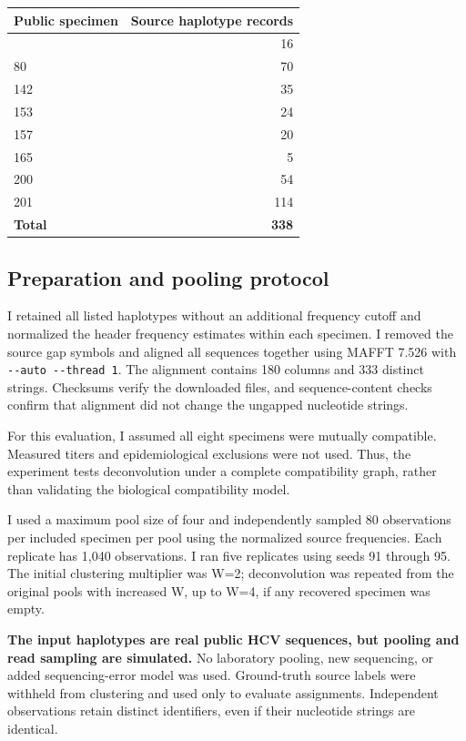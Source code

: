 \begin{longtable}[]{@{}lr@{}}
\toprule\noalign{}
Public specimen & Source haplotype records \\
\midrule\noalign{}
\endhead
\bottomrule\noalign{}
\endlastfoot
53 & 16 \\
80 & 70 \\
142 & 35 \\
153 & 24 \\
157 & 20 \\
165 & 5 \\
200 & 54 \\
201 & 114 \\
\textbf{Total} & \textbf{338} \\
\end{longtable}

\hypertarget{preparation-and-pooling-protocol}{%
\subsection{Preparation and pooling
protocol}\label{preparation-and-pooling-protocol}}

I retained all listed haplotypes without an additional frequency cutoff
and normalized the header frequency estimates within each specimen. I
removed the source gap symbols and aligned all sequences together using
MAFFT 7.526 with \texttt{-\/-auto\ -\/-thread\ 1}. The alignment
contains 180 columns and 333 distinct strings. Checksums verify the
downloaded files, and sequence-content checks confirm that alignment did
not change the ungapped nucleotide strings.

For this evaluation, I assumed all eight specimens were mutually
compatible. Measured titers and epidemiological exclusions were not
used. Thus, the experiment tests deconvolution under a complete
compatibility graph, rather than validating the biological compatibility
model.

I used a maximum pool size of four and independently sampled 80
observations per included specimen per pool using the normalized source
frequencies. Each replicate has 1,040 observations. I ran five
replicates using seeds 91 through 95. The initial clustering multiplier
was W=2; deconvolution was repeated from the original pools with
increased W, up to W=4, if any recovered specimen was empty.

\textbf{The input haplotypes are real public HCV sequences, but pooling
and read sampling are simulated.} No laboratory pooling, new sequencing,
or added sequencing-error model was used. Ground-truth source labels
were withheld from clustering and used only to evaluate assignments.
Independent observations retain distinct identifiers, even if their
nucleotide strings are identical.

